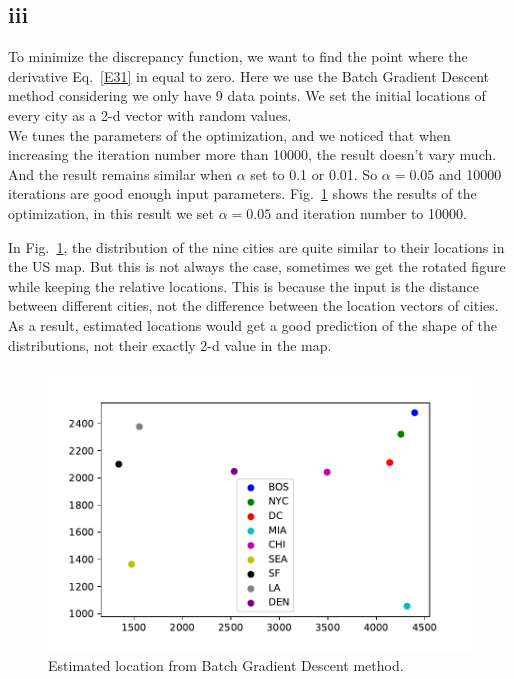 \documentclass[]{homework}
\begin{document}
 \subsection*{iii}
 To minimize the discrepancy function, we want to find the point where the derivative Eq.~\ref{E31} in equal to zero.
 Here we use the Batch Gradient Descent method considering we only have 9 data points.
 We set the initial locations of every city as a 2-d vector with random values. \\
 
We tunes the parameters of the optimization, and we noticed that when increasing the iteration number more than 10000, the result doesn't vary much.
And the result remains similar when $\alpha $ set to 0.1 or 0.01.
So  $\alpha = 0.05$  and 10000 iterations are good enough input parameters. 
 Fig.~\ref{EstiLoc} shows the results of the optimization, in this result we set $\alpha = 0.05$ and iteration number to 10000.

In Fig.~\ref{EstiLoc}, the distribution of the nine cities are quite similar to their locations in the US map.
But this is not always the case, sometimes we get the rotated figure while keeping the relative locations.
This is because the input is the distance between different cities, not the difference between the location vectors of cities.
As a result, estimated locations would get a good prediction of the shape of the distributions, not their exactly 2-d value in the map.

\begin{figure}[!htbp]
\centering
\includegraphics{figs/EstimatedLocation.pdf}
\caption{Estimated location from Batch Gradient Descent method.}
\label{EstiLoc}
\end{figure}
%
\end{document}
